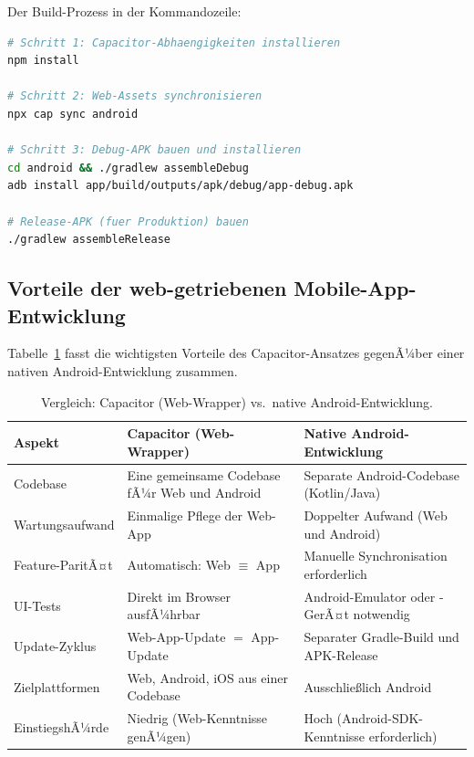 ﻿\documentclass[12pt,a4paper]{article}
\begin{document}
Der Build-Prozess in der Kommandozeile:

\begin{lstlisting}[language=bash, caption={EHAE-Android-App: Build-Ablauf.}]
# Schritt 1: Capacitor-Abhaengigkeiten installieren
npm install

# Schritt 2: Web-Assets synchronisieren
npx cap sync android

# Schritt 3: Debug-APK bauen und installieren
cd android && ./gradlew assembleDebug
adb install app/build/outputs/apk/debug/app-debug.apk

# Release-APK (fuer Produktion) bauen
./gradlew assembleRelease
\end{lstlisting}

\subsection{Vorteile der web-getriebenen Mobile-App-Entwicklung}

Tabelle~\ref{tab:capacitor_advantages} fasst die wichtigsten Vorteile des
Capacitor-Ansatzes gegenÃ¼ber einer nativen Android-Entwicklung zusammen.

\begin{table}[H]
\centering
\caption{Vergleich: Capacitor (Web-Wrapper) vs.\ native Android-Entwicklung.}
\label{tab:capacitor_advantages}
\begin{tabularx}{\textwidth}{lXX}
\toprule
\textbf{Aspekt} & \textbf{Capacitor (Web-Wrapper)} & \textbf{Native Android-Entwicklung} \\
\midrule
Codebase           & Eine gemeinsame Codebase fÃ¼r Web und Android
                   & Separate Android-Codebase (Kotlin/Java) \\
Wartungsaufwand    & Einmalige Pflege der Web-App
                   & Doppelter Aufwand (Web und Android) \\
Feature-ParitÃ¤t    & Automatisch: Web $\equiv$ App
                   & Manuelle Synchronisation erforderlich \\
UI-Tests           & Direkt im Browser ausfÃ¼hrbar
                   & Android-Emulator oder -GerÃ¤t notwendig \\
Update-Zyklus      & Web-App-Update $=$ App-Update
                   & Separater Gradle-Build und APK-Release \\
Zielplattformen    & Web, Android, iOS aus einer Codebase
                   & Ausschlie\ss{}lich Android \\
EinstiegshÃ¼rde     & Niedrig (Web-Kenntnisse genÃ¼gen)
                   & Hoch (Android-SDK-Kenntnisse erforderlich) \\
\bottomrule
\end{tabularx}
\end{table}
\end{document}
